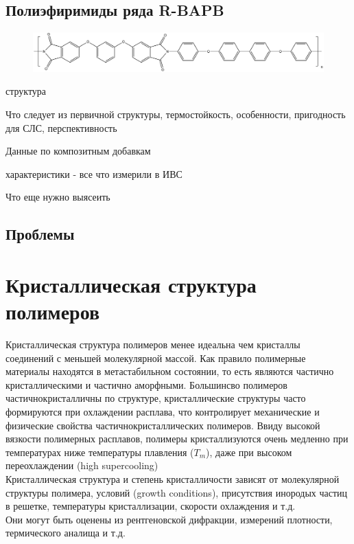 \subsection{Полиэфиримиды ряда R-BAPB }
		
	\begin{figure}[h]
	\includegraphics[width=\textwidth]{fig/formula.png}
	\end{figure}
	структура

Что следует из первичной структуры, термостойкость, особенности, пригодность для СЛС, перспективность

Данные по композитным добавкам

характеристики - все что измерили в ИВС

Что еще нужно выясеить

\subsection{Проблемы}



\section{Кристаллическая структура полимеров}
Кристаллическая структура полимеров менее идеальна чем кристаллы соединений с меньшей молекулярной массой. Как правило полимерные материалы находятся в метастабильном состоянии, то есть являются частично кристаллическими и частично аморфными. Большинсво полимеров частичнокристалличны по структуре, кристаллические структуры часто формируются при охлаждении расплава, что контролирует механические и физические свойства частичнокристаллических полимеров. Ввиду высокой вязкости полимерных расплавов, полимеры кристаллизуются очень медленно при температурах ниже температуры плавления ($T_m$), даже при высоком переохлаждении (high supercooling)
\\
Кристаллическая структура и степень кристалличости зависят от молекулярной структуры полимера, условий (growth
conditions), присутствия инородых частиц в решетке, температуры кристаллизации, скорости охлаждения и т.д.\\
Они могут быть оценены из рентгеновской дифракции, измерений плотности, термического аналища и т.д.

